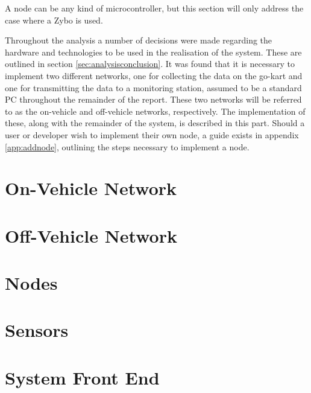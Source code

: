 
A node can be any kind of microcontroller, but this section will only address the case where a Zybo is used. 

Throughout the analysis a number of decisions were made regarding the hardware and technologies to be used in the realisation of the system.
These are outlined in section \ref{sec:analysisconclusion}.
It was found that it is necessary to implement two different networks, one for collecting the data on the go-kart and one for transmitting the data to a monitoring station, assumed to be a standard PC throughout the remainder of the report.
These two networks will be referred to as the on-vehicle and off-vehicle networks, respectively.
The implementation of these, along with the remainder of the system, is described in this part.
Should a user or developer wish to implement their own node, a guide exists in appendix \ref{app:addnode}, outlining the steps necessary to implement a node.
\section{On-Vehicle Network}






\section{Off-Vehicle Network}
\label{sec:wifi}

\section{Nodes}

\section{Sensors}

\section{System Front End}
